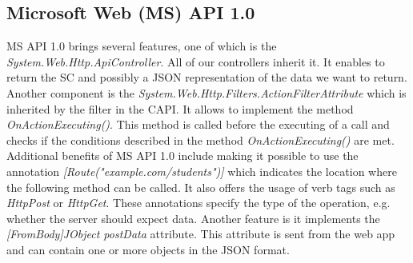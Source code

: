 \subsection{Microsoft Web (MS) API 1.0}
MS API 1.0 brings several features, one of which is the \textit{System.Web.Http.ApiController}. All of our controllers inherit it. It enables to return the SC and possibly a JSON representation of the data we want to return. Another component is the \textit{System.Web.Http.Filters.ActionFilterAttribute} which is inherited by the filter in the CAPI. It allows to implement the method \textit{OnActionExecuting()}. This method is called before the executing of a call and checks if the conditions described in the method \textit{OnActionExecuting()} are met. Additional benefits of MS API 1.0 include making it possible to use the annotation \textit{[Route("example.com/students")]} which indicates the location where the following method can be called. It also offers the usage of verb tags such as \textit{HttpPost} or \textit{HttpGet}. These annotations specify the type of the operation, e.g. whether the server should expect data. Another feature is it implements the \textit{[FromBody]JObject postData} attribute. This attribute is sent from the web app and can contain one or more objects in the JSON format. 

